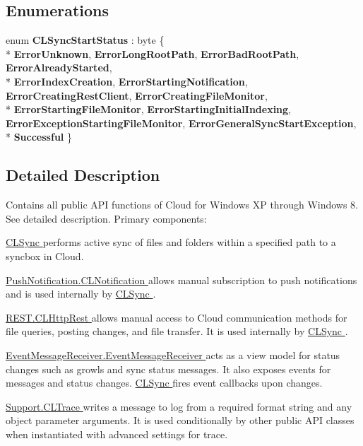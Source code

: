 \subsection*{Enumerations}
\begin{DoxyCompactItemize}
\item 
enum {\bfseries C\-L\-Sync\-Start\-Status} \-: byte \{ \\*
{\bfseries Error\-Unknown}, 
{\bfseries Error\-Long\-Root\-Path}, 
{\bfseries Error\-Bad\-Root\-Path}, 
{\bfseries Error\-Already\-Started}, 
\\*
{\bfseries Error\-Index\-Creation}, 
{\bfseries Error\-Starting\-Notification}, 
{\bfseries Error\-Creating\-Rest\-Client}, 
{\bfseries Error\-Creating\-File\-Monitor}, 
\\*
{\bfseries Error\-Starting\-File\-Monitor}, 
{\bfseries Error\-Starting\-Initial\-Indexing}, 
{\bfseries Error\-Exception\-Starting\-File\-Monitor}, 
{\bfseries Error\-General\-Sync\-Start\-Exception}, 
\\*
{\bfseries Successful}
 \}
\end{DoxyCompactItemize}


\subsection{Detailed Description}
Contains all public A\-P\-I functions of Cloud for Windows X\-P through Windows 8. See detailed description. Primary components\-:\par
 \hyperlink{class_cloud_api_public_1_1_c_l_sync}{C\-L\-Sync } performs active sync of files and folders within a specified path to a syncbox in Cloud.\par
 \hyperlink{class_cloud_api_public_1_1_push_notification_1_1_c_l_notification}{Push\-Notification.\-C\-L\-Notification } allows manual subscription to push notifications and is used internally by \hyperlink{class_cloud_api_public_1_1_c_l_sync}{C\-L\-Sync }.\par
 \hyperlink{class_cloud_api_public_1_1_r_e_s_t_1_1_c_l_http_rest}{R\-E\-S\-T.\-C\-L\-Http\-Rest } allows manual access to Cloud communication methods for file queries, posting changes, and file transfer. It is used internally by \hyperlink{class_cloud_api_public_1_1_c_l_sync}{C\-L\-Sync }.\par
 \hyperlink{class_cloud_api_public_1_1_event_message_receiver_1_1_event_message_receiver}{Event\-Message\-Receiver.\-Event\-Message\-Receiver } acts as a view model for status changes such as growls and sync status messages. It also exposes events for messages and status changes. \hyperlink{class_cloud_api_public_1_1_c_l_sync}{C\-L\-Sync } fires event callbacks upon changes.\par
 \hyperlink{class_cloud_api_public_1_1_support_1_1_c_l_trace}{Support.\-C\-L\-Trace } writes a message to log from a required format string and any object parameter arguments. It is used conditionally by other public A\-P\-I classes when instantiated with advanced settings for trace. 